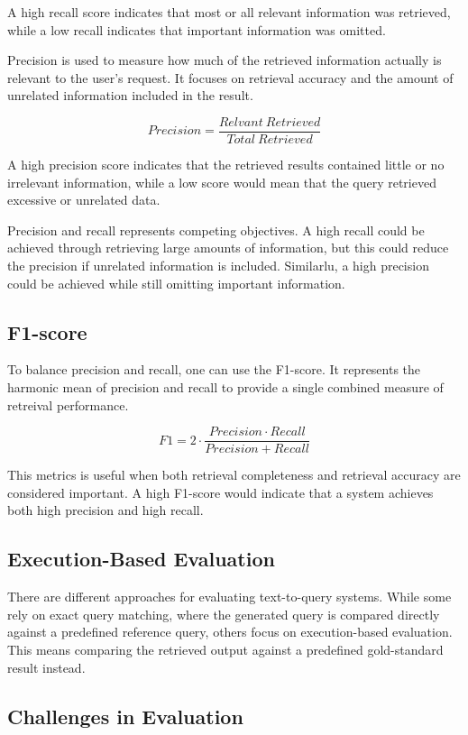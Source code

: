 A high recall score indicates that most or all relevant information was retrieved, while a low recall indicates that important information was omitted. 

Precision is used to measure how much of the retrieved information actually is relevant to the user's request. It focuses on retrieval accuracy and the amount of unrelated information included in the result. 

\[
Precision = \frac{Relvant\ Retrieved}{Total\ Retrieved}
\]

A high precision score indicates that the retrieved results contained little or no irrelevant information, while a low score would mean that the query retrieved excessive or unrelated data. 

Precision and recall represents competing objectives. A high recall could be achieved through retrieving large amounts of information, but this could reduce the precision if unrelated information is included. Similarlu, a high precision could be achieved while still omitting important information. 

\subsection{F1-score}

To balance precision and recall, one can use the F1-score. It represents the harmonic mean of precision and recall to provide a single combined measure of retreival performance. 

\[
F1 = 2 \cdot \frac{Precision \cdot Recall}{Precision + Recall}
\]

This metrics is useful when both retrieval completeness and retrieval accuracy are considered important. A high F1-score would indicate that a system achieves both high precision and high recall. 

\subsection{Execution-Based Evaluation}

There are different approaches for evaluating text-to-query systems. While some rely on exact query matching, where the generated query is compared directly against a predefined reference query, others focus on execution-based evaluation. This means comparing the retrieved output against a predefined gold-standard result instead. 

\subsection{Challenges in Evaluation}

